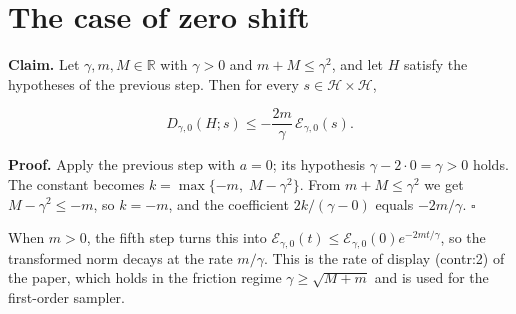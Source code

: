 \documentclass[11pt,a4paper]{article}
\begin{document}
\section{\texorpdfstring{The case of zero shift}{The case of zero shift}}


\textbf{Claim.} Let \(\gamma,m,M\in\mathbb R\) with \(\gamma>0\) and \(m+M\le\gamma^2\), and let \(H\) satisfy the hypotheses of the previous step. Then for every \(s\in\mathcal H\times\mathcal H\),


\[D_{\gamma,0}(H;s)\le-\frac{2m}{\gamma}\,\mathcal E_{\gamma,0}(s).\]


\textbf{Proof.} Apply the previous step with \(a=0\); its hypothesis \(\gamma-2\cdot0=\gamma>0\) holds. The constant becomes \(k=\max\{-m,\;M-\gamma^2\}\). From \(m+M\le\gamma^2\) we get \(M-\gamma^2\le-m\), so \(k=-m\), and the coefficient \(2k/(\gamma-0)\) equals \(-2m/\gamma\). \(\square\)




When \(m>0\), the fifth step turns this into \(\mathcal E_{\gamma,0}(t)\le\mathcal E_{\gamma,0}(0)e^{-2mt/\gamma}\), so the transformed norm decays at the rate \(m/\gamma\). This is the rate of display (contr:2) of the paper, which holds in the friction regime \(\gamma\ge\sqrt{M+m}\) and is used for the first-order sampler.
\end{document}
